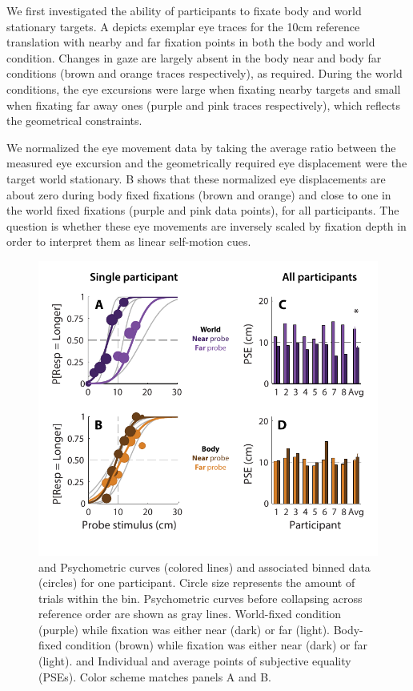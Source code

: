 We first investigated the ability of participants to fixate body and world stationary targets. A depicts exemplar eye traces for the 10cm reference translation with nearby and far fixation points in both the body and world condition. Changes in gaze are largely absent in the body near and body far conditions (brown and orange traces respectively), as required. During the world conditions, the eye excursions were large when fixating nearby targets and small when fixating far away ones (purple and pink traces respectively), which reflects the geometrical constraints.

We normalized the eye movement data by taking the average ratio between the measured eye excursion and the geometrically required eye displacement were the target world stationary. B shows that these normalized eye displacements are about zero during body fixed fixations (brown and orange) and close to one in the world fixed fixations (purple and pink data points), for all participants. The question is whether these eye movements are inversely scaled by fixation depth in order to interpret them as linear self-motion cues.

\begin{figure}
    \includegraphics[width=1.0\textwidth]{src/paper4/p4_figure3.pdf}

	\caption{ and  Psychometric curves (colored lines) and associated binned data (circles) for one participant. Circle size represents the amount of trials within the bin. Psychometric curves before collapsing across reference order are shown as gray lines.  World-fixed condition (purple) while fixation was either near (dark) or far (light).  Body-fixed condition (brown) while fixation was either near (dark) or far (light).
	 and  Individual and average points of subjective equality (PSEs). Color scheme matches panels A and B.
	}
	\label{p4:fig3}
\end{figure}

